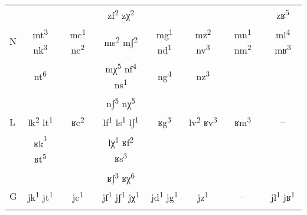 \begin{table}
{\begin{tabular}{lccccccc}
& {} & 
{} & 
{\cellcolor[rgb]{.95,.73,1}zf\textsuperscript{2} zχ\textsuperscript{2}} & & 
{} & & 
{zʁ\textsuperscript{5}}\\

{N} & 
{mt\textsuperscript{3} nk\textsuperscript{3}} & 
{mc\textsuperscript{1} nc\textsuperscript{2}} & 
{ms\textsuperscript{2} mʃ\textsuperscript{2} } & 
{mg\textsuperscript{1} nd\textsuperscript{1}} & 
{mz\textsuperscript{2} nv\textsuperscript{3}} & 
{mn\textsuperscript{1} nm\textsuperscript{2}} & 
{ml\textsuperscript{4} mʁ\textsuperscript{3}}\\

& {nt\textsuperscript{6}} & 
{} & 
{mχ\textsuperscript{5} nf\textsuperscript{4} ns\textsuperscript{1} } & 
{ng\textsuperscript{4}} & 
{nz\textsuperscript{3}} & 
{} & 
{}\\

& & & {nʃ\textsuperscript{5} nχ\textsuperscript{5}} & & & & \\

{L} & 
{lk\textsuperscript{2} lt\textsuperscript{1}} & 
{ʁc\textsuperscript{2}} & 
{lf\textsuperscript{1} ls\textsuperscript{1} lʃ\textsuperscript{1}} & 
{ʁg\textsuperscript{3}} & 
{lv\textsuperscript{2} ʁv\textsuperscript{3}} & 
{ʁm\textsuperscript{3}} & 
{--}\\

& {ʁk\textsuperscript{\textsuperscript{3}} ʁt\textsuperscript{5}} & & 
{lχ\textsuperscript{1} ʁf\textsuperscript{2} ʁs\textsuperscript{3}} & & & 
{} & \\

& & & {ʁʃ\textsuperscript{3} ʁχ\textsuperscript{6}} & & & & \\

{G} & 
{jk\textsuperscript{1} jt\textsuperscript{1}} & 
{jc\textsuperscript{1}} & 
{jf\textsuperscript{1} jʃ\textsuperscript{1} jχ\textsuperscript{1}} & 
{jd\textsuperscript{1} jg\textsuperscript{1}} & 
{jz\textsuperscript{1}} & 
{--} & 
{jl\textsuperscript{1} jʁ\textsuperscript{1}}\\

\lspbottomrule
\end{tabular}}
\end{table}

